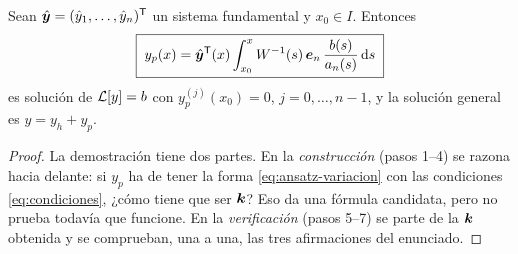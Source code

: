 \begin{teorema}\label{teo:variacion}
Sean $\hat{\bm y}=(\hat y_1,\dots,\hat y_n)^{\mathsf{T}}$ un sistema fundamental y $x_0\in I$.
Entonces
\begin{equation}\label{eq:variacion}
  \boxed{\;y_p(x)=\hat{\bm y}^{\mathsf{T}}(x)\int_{x_0}^{x}W^{-1}(s)\,\bm{e}_n\,\frac{b(s)}{a_n(s)}\,\mathrm{d} s\;}
\end{equation}
es solución de $\mathcal{L}[y]=b$ con $y_p^{(j)}(x_0)=0$, $j=0,\dots,n-1$, y la
solución general es $y=y_h+y_p$.
\end{teorema}

\begin{proof}
La demostración tiene dos partes. En la \emph{construcción} (pasos 1--4)
se razona hacia delante: si $y_p$ ha de tener la forma
\eqref{eq:ansatz-variacion} con las condiciones \eqref{eq:condiciones},
¿cómo tiene que ser $\bm{k}$? Eso da una fórmula candidata, pero no prueba
todavía que funcione. En la \emph{verificación} (pasos 5--7) se parte de la
$\bm{k}$ obtenida y se comprueban, una a una, las tres afirmaciones del
enunciado.


\end{proof}
